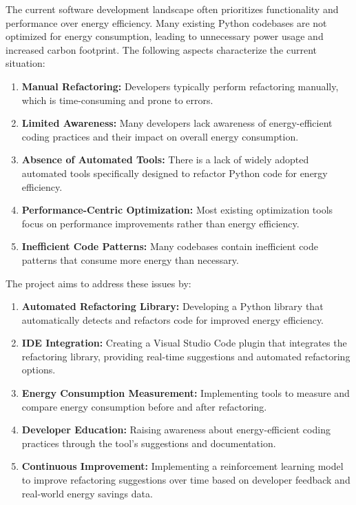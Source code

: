\documentclass[12pt]{article}
\begin{document}
  The current software development landscape often prioritizes functionality and performance over energy efficiency. Many existing Python codebases are not optimized for energy consumption, leading to unnecessary power usage and increased carbon footprint. The following aspects characterize the current situation:
  \begin{enumerate}
    \item \textbf{Manual Refactoring:} Developers typically perform refactoring manually, which is time-consuming and prone to errors.
    \item \textbf{Limited Awareness:} Many developers lack awareness of energy-efficient coding practices and their impact on overall energy consumption.
    \item \textbf{Absence of Automated Tools:} There is a lack of widely adopted automated tools specifically designed to refactor Python code for energy efficiency.
    \item \textbf{Performance-Centric Optimization:} Most existing optimization tools focus on performance improvements rather than energy efficiency.
    \item \textbf{Inefficient Code Patterns:} Many codebases contain inefficient code patterns that consume more energy than necessary.
  \end{enumerate}

  The project aims to address these issues by:
  \begin{enumerate}
    \item \textbf{Automated Refactoring Library:} Developing a Python library that automatically detects and refactors code for improved energy efficiency.
    \item \textbf{IDE Integration:} Creating a Visual Studio Code plugin that integrates the refactoring library, providing real-time suggestions and automated refactoring options.
    \item \textbf{Energy Consumption Measurement:} Implementing tools to measure and compare energy consumption before and after refactoring.
    \item \textbf{Developer Education:} Raising awareness about energy-efficient coding practices through the tool's suggestions and documentation.
    \item \textbf{Continuous Improvement:} Implementing a reinforcement learning model to improve refactoring suggestions over time based on developer feedback and real-world energy savings data.
  \end{enumerate}  
\end{document}
